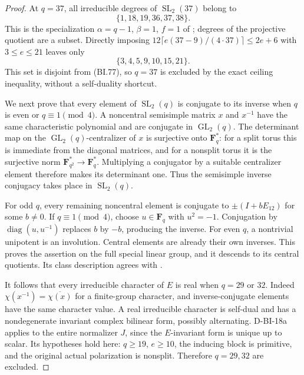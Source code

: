 \begin{proof}
At $q=37$, all irreducible degrees of $\operatorname{SL}_2(37)$
belong to
\[
                       \{1,18,19,36,37,38\}.               \tag{BI.77}
\]
This is the specialization $\alpha=q-1$, $\beta=1$, $f=1$ of
\cite[Theorem~B, p.~4]{BI:WhiteSL2}; degrees of the projective
quotient are a subset.  Directly imposing
$12\lceil e(37-9)/(4\cdot37)\rceil\le2e+6$ with
$3\le e\le21$ leaves only
\[
                         \{3,4,5,9,10,15,21\}.
\]
This set is disjoint from (BI.77), so $q=37$ is excluded by the
exact ceiling inequality, without a self-duality shortcut.

We next prove that every element of $\operatorname{SL}_2(q)$
is conjugate to its inverse when $q$ is even or $q\equiv1\pmod4$.
A noncentral semisimple matrix $x$ and $x^{-1}$ have the same
characteristic polynomial and are conjugate in
$\operatorname{GL}_2(q)$.  The determinant map on the
$\operatorname{GL}_2(q)$-centralizer of $x$ is surjective onto
$\mathbf F_q^*$: for a split torus this is immediate from the
diagonal matrices, and for a nonsplit torus it is the surjective
norm $\mathbf F_{q^2}^*\to\mathbf F_q^*$.  Multiplying a
conjugator by a suitable centralizer element therefore makes its
determinant one.  Thus the semisimple inverse conjugacy takes
place in $\operatorname{SL}_2(q)$.

For odd $q$, every remaining noncentral element is conjugate to
$\pm(I+bE_{12})$ for some $b\ne0$.  If $q\equiv1\pmod4$,
choose $u\in\mathbf F_q$ with $u^2=-1$.  Conjugation by
$\operatorname{diag}(u,u^{-1})$ replaces $b$ by $-b$, producing
the inverse.  For even $q$, a nontrivial unipotent is an
involution.  Central elements are already their own inverses.
This proves the assertion on the full special linear group, and
it descends to its central quotients.  Its class description agrees
with \cite[\S3, pp.~5--7]{BI:WhiteSL2}.

It follows that every irreducible character of $E$ is real when
$q=29$ or $32$.  Indeed $\chi(x^{-1})=\overline{\chi(x)}$
for a finite-group character, and inverse-conjugate elements have
the same character value.  A real irreducible character is
self-dual and has a nondegenerate invariant complex bilinear form,
possibly alternating.  D-BI-18a applies to the entire normalizer
$J$, since the $E$-invariant form is unique up to scalar.  Its
hypotheses hold here: $q\ge19$, $e\ge10$, the inducing block is
primitive, and the original actual polarization is nonsplit.
Therefore $q=29,32$ are excluded.


\end{proof}
